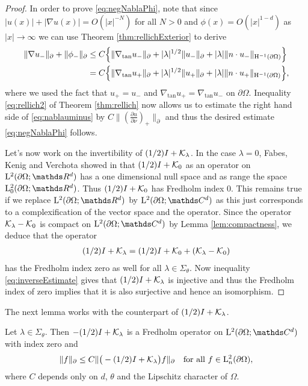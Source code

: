 \begin{proof}
  In order to prove \eqref{eq:negNablaPhi}, note that since $|u(x)| + |\nabla u(x)| = O(|x|^{-N})$ for all $N > 0$ and $\phi(x) = O(|x|^{1 - d})$ as $|x| \to \infty$ we can use Theorem \ref{thm:rellichExterior} to derive
  \begin{align}
    \|\nabla u_-\|_\partial + \|\phi_-\|_\partial
    &\leq C \Big\{ \|\nabla_{\mathrm{tan}} u_- \|_\partial + |\lambda|^{1/2} \| u_-\|_\partial + |\lambda| \| n \cdot u_-\|_{\mathrm{H}^{-1}(\partial\Omega)} \Big\} \nonumber\\
    \label{eq:nablauminus}
    &= C \Big\{ \|\nabla_{\mathrm{tan}} u_+ \|_\partial + |\lambda|^{1/2} \| u_+ \|_\partial + |\lambda| \|n \cdot u_+ \|_{\mathrm{H}^{-1}(\partial\Omega)} \Big\},
  \end{align}
  where we used the fact that $u_+ = u_-$ and $\nabla_{\mathrm{tan}} u_+ = \nabla_{\mathrm{tan}} u_-$ on $\partial\Omega$.
  Inequality \eqref{eq:rellich2} of Theorem \ref{thm:rellich} now allows us to estimate the right hand side of \eqref{eq:nablauminus} by $C \|(\frac{\partial u}{\partial \nu} )_+ \|_\partial$ and thus the desired estimate \eqref{eq:negNablaPhi} follows.

  Let's now work on the invertibility of $(1/2) I + \mathcal{K}_\lambda$. In the case $\lambda = 0$, Fabes, Kenig and Verchota showed in \cite{fabesKenigVerchota} that $(1/2) I + \mathcal{K}_0$ as an operator on $\Ell^2(\partial\Omega; \R^d)$ has a one dimensional null space and as range the space $\Ell_0^2(\partial\Omega; \R^d)$.
  Thus $(1/2) I + \mathcal{K}_0$ has Fredholm index $0$.
  This remains true if we replace $\Ell^2(\partial\Omega; \R^d)$ by $\Ell^2(\partial\Omega; \C^d)$ as this just corresponds to a complexification of the vector space and the operator. 
  Since the operator $\mathcal{K}_\lambda - \mathcal{K}_0$ is compact on $\Ell^2(\partial\Omega; \C^d)$ by Lemma \ref{lem:compactness}, we deduce that the operator
  \begin{align*}
    (1/2)I + \mathcal{K}_\lambda = (1/2)I + \mathcal{K}_0 + (\mathcal{K}_\lambda - \mathcal{K}_0)
  \end{align*}
  has the Fredholm index zero as well for all $\lambda \in \Sigma_\theta$.
  Now inequality \eqref{eq:inverseEstimate} gives that $(1/2)I + \mathcal{K}_\lambda$ is injective and thus the Fredholm index of zero implies that it is also surjective and hence an isomorphism.
\end{proof}

The next lemma works with the counterpart of $(1/2)I + \mathcal{K}_\lambda$.

\begin{lem}
  \label{lem:inverseEstimate}
  Let $\lambda \in \Sigma_\theta$.
  Then $-(1/2)I + \mathcal{K}_\lambda$ is a Fredholm operator on $\Ell^2(\partial\Omega; \C^d)$ with index zero and
  \begin{align}
    \label{eq:inverseEstimate2}
    \| f\|_\partial \leq C \| \big( - (1/2) I + \mathcal{K}_\lambda \big) f \|_\partial \quad\text{for all } f \in \mathrm{L}^2_n(\partial\Omega),
  \end{align}
  where $C$ depends only on $d$, $\theta$ and the Lipschitz character of $\Omega$.
\end{lem}

